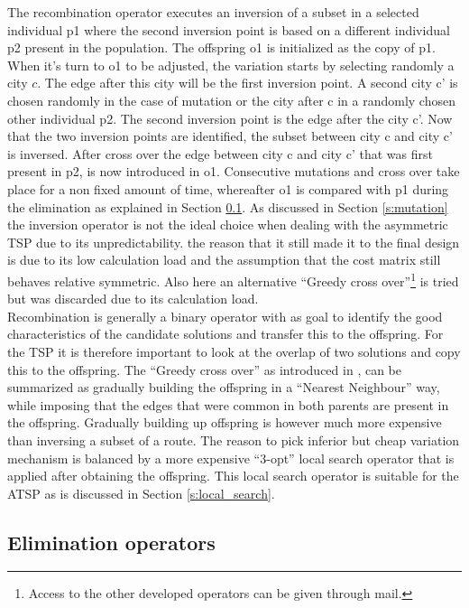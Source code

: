 \documentclass[a4paper,10pt]{article}
\begin{document}
The recombination operator executes an inversion of a subset in a selected individual p1 where the second inversion point is based on a different individual p2 present in the population. The offspring o1 is initialized as the copy of p1. When it's turn to o1 to be adjusted, the variation starts by selecting randomly a city $c$. The edge after this city will be the first inversion point. A second city c' is chosen randomly in the case of mutation or the city after c in a randomly chosen other individual p2. The second inversion point is the edge after the city c'. Now that the two inversion points are identified, the subset between city c and city c' is inversed. After cross over the edge between city c and city c' that was first present in p2, is now introduced in o1. Consecutive mutations and cross over take place for a non fixed amount of time, whereafter o1 is compared with p1 during the elimination as explained in Section \ref{s:elimination}. As discussed in Section \ref{s:mutation} the inversion operator is not the ideal choice when dealing with the asymmetric TSP due to its unpredictability. the reason that it still made it to the final design is due to its low calculation load and the assumption that the cost matrix still behaves relative symmetric. Also here an alternative ``Greedy cross over''\footnote{Access to the other developed operators can be given through mail.} is tried but was discarded due to its calculation load.\\

Recombination is generally a binary operator with as goal to identify the good characteristics of the candidate solutions and transfer this to the offspring. For the TSP it is therefore important to look at the overlap of two solutions and copy this to the offspring. The ``Greedy cross over'' as introduced in \cite{Reisleben1996}, can be summarized as gradually building the offspring in a ``Nearest Neighbour'' way, while imposing that the edges that were common in both parents are present in the offspring. Gradually building up offspring is however much more expensive than inversing a subset of a route. The reason to pick inferior but cheap variation mechanism is balanced by a more expensive ``3-opt'' local search operator that is applied after obtaining the offspring. This local search operator is suitable for the ATSP as is discussed in Section \ref{s:local_search}. 


\subsection{Elimination operators}\label{s:elimination}
\end{document}
